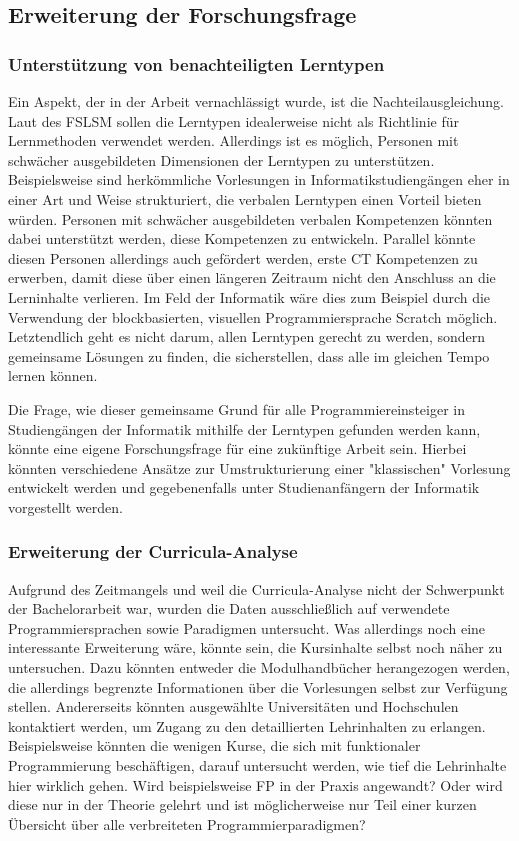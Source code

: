 \subsection{Erweiterung der Forschungsfrage}\label{sec:future}
\subsubsection{Unterstützung von benachteiligten Lerntypen}
Ein Aspekt, der in der Arbeit vernachlässigt wurde, ist die Nachteilausgleichung. Laut des FSLSM sollen die Lerntypen idealerweise nicht als Richtlinie für Lernmethoden verwendet werden. Allerdings ist es möglich, Personen mit schwächer ausgebildeten Dimensionen der Lerntypen zu unterstützen.
Beispielsweise sind herkömmliche Vorlesungen in Informatikstudiengängen eher in einer Art und Weise strukturiert, die verbalen Lerntypen einen Vorteil bieten würden. Personen mit schwächer ausgebildeten verbalen Kompetenzen könnten dabei unterstützt werden, diese Kompetenzen zu entwickeln. Parallel könnte diesen Personen allerdings auch gefördert werden, erste CT Kompetenzen zu erwerben, damit diese über einen längeren Zeitraum nicht den Anschluss an die Lerninhalte verlieren. Im Feld der Informatik wäre dies zum Beispiel durch die Verwendung der blockbasierten, visuellen Programmiersprache Scratch möglich.
Letztendlich geht es nicht darum, allen Lerntypen gerecht zu werden, sondern gemeinsame Lösungen zu finden, die sicherstellen, dass alle im gleichen Tempo lernen können.

Die Frage, wie dieser gemeinsame Grund für alle Programmiereinsteiger in Studiengängen der Informatik mithilfe der Lerntypen gefunden werden kann, könnte eine eigene Forschungsfrage für eine zukünftige Arbeit sein. Hierbei könnten verschiedene Ansätze zur Umstrukturierung einer "klassischen" Vorlesung entwickelt werden und gegebenenfalls unter Studienanfängern der Informatik vorgestellt werden.

\subsubsection{Erweiterung der Curricula-Analyse}
Aufgrund des Zeitmangels und weil die Curricula-Analyse nicht der Schwerpunkt der Bachelorarbeit war, wurden die Daten ausschließlich auf verwendete Programmiersprachen sowie Paradigmen untersucht. Was allerdings noch eine interessante Erweiterung wäre, könnte sein, die Kursinhalte selbst noch näher zu untersuchen. Dazu könnten entweder die Modulhandbücher herangezogen werden, die allerdings begrenzte Informationen über die Vorlesungen selbst zur Verfügung stellen. Andererseits könnten ausgewählte Universitäten und Hochschulen kontaktiert werden, um Zugang zu den detaillierten Lehrinhalten zu erlangen.
Beispielsweise könnten die wenigen Kurse, die sich mit funktionaler Programmierung beschäftigen, darauf untersucht werden, wie tief die Lehrinhalte hier wirklich gehen. Wird beispielsweise FP in der Praxis angewandt? Oder wird diese nur in der Theorie gelehrt und ist möglicherweise nur Teil einer kurzen Übersicht über alle verbreiteten Programmierparadigmen?

